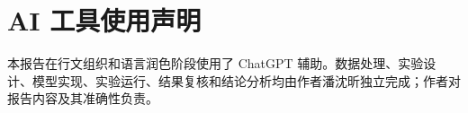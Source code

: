 \documentclass[11pt,a4paper]{article}
\begin{document}
\section*{AI 工具使用声明}
本报告在行文组织和语言润色阶段使用了 ChatGPT 辅助。数据处理、实验设计、模型实现、实验运行、结果复核和结论分析均由作者潘沈昕独立完成；作者对报告内容及其准确性负责。
\end{document}
